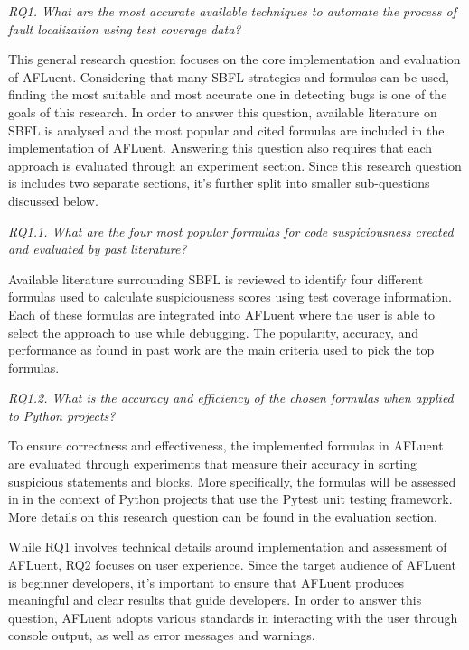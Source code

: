 \begin{center}
	\emph{RQ1. What are the most accurate available techniques to automate the process of
	fault localization using test coverage data?
	}
\end{center}
\label{para:RQ1}

This general research question focuses on the core implementation and
evaluation of AFLuent. Considering that many SBFL strategies and formulas can be
used, finding the most suitable and most accurate one in detecting bugs is one
of the goals of this research. In order to answer this question,
available literature on SBFL is analysed and the most popular and cited formulas
are included in the implementation of AFLuent. Answering this question also
requires that each approach is evaluated through an experiment section.
Since this research question is includes two separate sections, it's further split into
smaller sub-questions discussed below.

\begin{center}
	\emph{RQ1.1. What are the four most popular formulas for code suspiciousness
	created and evaluated by past literature?
	}
\end{center}
\label{para:RQ1.1}

Available literature surrounding SBFL is reviewed to identify four
different formulas used to calculate suspiciousness scores using test coverage
information. Each of these formulas are integrated into AFLuent where the user
is able to select the approach to use while debugging. The popularity, accuracy,
and performance as found in past work are the main criteria used to pick the top
formulas.


\begin{center}
	\emph{RQ1.2.  What is the accuracy and efficiency of the chosen
	formulas when applied to Python projects?
	}
\end{center}
\label{para:RQ1.2}

To ensure correctness and effectiveness, the implemented formulas in AFLuent are
evaluated through experiments that measure their accuracy in sorting suspicious
statements and blocks. More specifically, the formulas will be assessed in in
the context of Python projects that use the Pytest unit testing framework.
More details on this research question can be found in the evaluation section.

While RQ1 involves technical details around implementation and assessment of
AFLuent, RQ2 focuses on user experience. Since the target audience of AFLuent is
beginner developers, it's important to ensure that AFLuent produces meaningful
and clear results that guide developers. In order to answer this question,
AFLuent adopts various standards in interacting with the user through console
output, as well as error messages and warnings.


